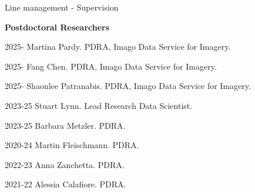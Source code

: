 \documentclass[12pt,2up]{article}
\begin{document}
\begin{cv}{}
\begin{cvlist}{Line management - Supervision}


\item[\textbf{Postdoctoral Researchers}]
\item[2025-] Martina Pardy. PDRA, Imago Data Service for Imagery.
\item[2025-] Fang Chen. PDRA, Imago Data Service for Imagery.
\item[2025-] Shaonlee Patranabis. PDRA, Imago Data Service for Imagery.
\item[2023-25] Stuart Lynn. Lead Research Data Scientist.
\item[2023-25] Barbara Metzler. PDRA.
\item[2020-24] Martin Fleischmann. PDRA.
\item[2022-23] Anna Zanchetta. PDRA.
\item[2021-22] Alessia Calafiore. PDRA.


\end{cvlist}
\end{cv}
\end{document}
